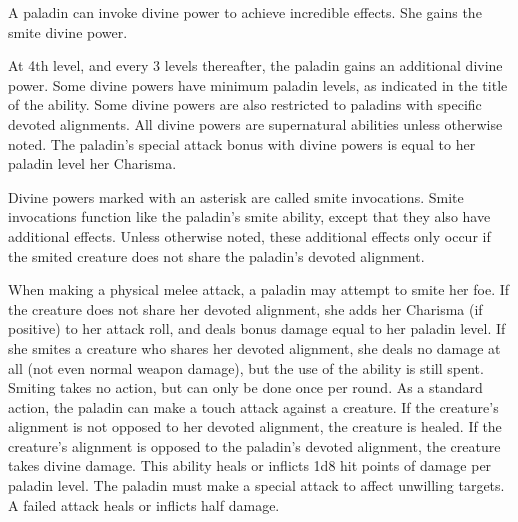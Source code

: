  A paladin can invoke divine power to achieve incredible effects. She gains the smite divine power.

At 4th level, and every 3 levels thereafter, the paladin gains an additional divine power. Some divine powers have minimum paladin levels, as indicated in the title of the ability. Some divine powers are also restricted to paladins with specific devoted alignments. All divine powers are supernatural abilities unless otherwise noted. The paladin's special attack bonus with divine powers is equal to her paladin level \add her Charisma.

Divine powers marked with an asterisk are called smite invocations. Smite invocations function like the paladin's smite ability, except that they also have additional effects. Unless otherwise noted, these additional effects only occur if the smited creature does not share the paladin's devoted alignment.


 When making a physical melee attack, a paladin may attempt to smite her foe. If the creature does not share her devoted alignment, she adds her Charisma (if positive) to her attack roll, and deals bonus damage equal to her paladin level. If she smites a creature who shares her devoted alignment, she deals no damage at all (not even normal weapon damage), but the use of the ability is still spent. Smiting takes no action, but can only be done once per round.
 As a standard action, the paladin can make a touch attack against a creature. If the creature's alignment is not opposed to her devoted alignment, the creature is healed. If the creature's alignment is opposed to the paladin's devoted alignment, the creature takes divine damage. This ability heals or inflicts 1d8 hit points of damage per paladin level. The paladin must make a special attack to affect unwilling targets. A failed attack heals or inflicts half damage.

